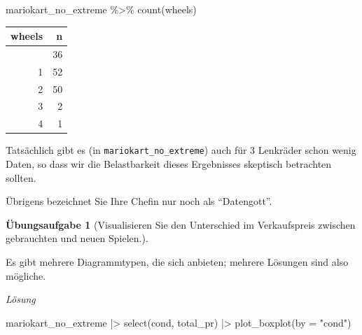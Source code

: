 \documentclass[
  letterpaper,
]{scrbook}
\newenvironment{Shaded}{\begin{snugshade}}{\end{snugshade}}
\newcommand{\AttributeTok}[1]{\textcolor[rgb]{0.40,0.45,0.13}{#1}}
\newcommand{\FunctionTok}[1]{\textcolor[rgb]{0.28,0.35,0.67}{#1}}
\newcommand{\NormalTok}[1]{\textcolor[rgb]{0.00,0.23,0.31}{#1}}
\newcommand{\SpecialCharTok}[1]{\textcolor[rgb]{0.37,0.37,0.37}{#1}}
\newcommand{\StringTok}[1]{\textcolor[rgb]{0.13,0.47,0.30}{#1}}
\theoremstyle{definition}
\newtheorem{exercise}{Übungsaufgabe}[chapter]
\theoremstyle{definition}
\theoremstyle{definition}
\theoremstyle{remark}
\begin{document}
\begin{Shaded}
\begin{Highlighting}[]
\NormalTok{mariokart\_no\_extreme }\SpecialCharTok{\%\textgreater{}\%} 
  \FunctionTok{count}\NormalTok{(wheels)}
\end{Highlighting}
\end{Shaded}

\begin{longtable}[]{@{}rr@{}}
\toprule\noalign{}
wheels & n \\
\midrule\noalign{}
\endhead
\bottomrule\noalign{}
\endlastfoot
0 & 36 \\
1 & 52 \\
2 & 50 \\
3 & 2 \\
4 & 1 \\
\end{longtable}

Tatsächlich gibt es (in \texttt{mariokart\_no\_extreme}) auch für 3
Lenkräder schon wenig Daten, so dass wir die Belastbarkeit dieses
Ergebnisses skeptisch betrachten sollten.

Übrigens bezeichnet Sie Ihre Chefin nur noch als \enquote{Datengott}.

\begin{exercise}[Visualisieren Sie den Unterschied im Verkaufspreis
zwischen gebrauchten und neuen
Spielen.]\protect\hypertarget{exr-diff-plot}{}\label{exr-diff-plot}

Es gibt mehrere Diagrammtypen, die sich anbieten; mehrere Lösungen sind
also mögliche.

\emph{Lösung}

\begin{Shaded}
\begin{Highlighting}[]
\NormalTok{mariokart\_no\_extreme }\SpecialCharTok{|\textgreater{}} 
  \FunctionTok{select}\NormalTok{(cond, total\_pr) }\SpecialCharTok{|\textgreater{}} 
  \FunctionTok{plot\_boxplot}\NormalTok{(}\AttributeTok{by =} \StringTok{"cond"}\NormalTok{)}
\end{Highlighting}
\end{Shaded}

\end{exercise}
\end{document}
